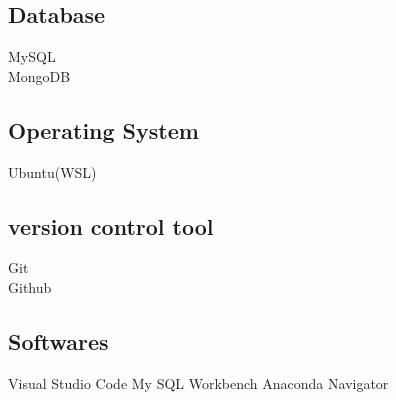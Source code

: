 \documentclass[]{deedy-resume-openfont}
\begin{document}
\begin{minipage}[t]{0.33\textwidth}
\subsection{Database}

\textbullet{} MySQL \\
\textbullet{} MongoDB \\

\subsection{Operating System}

\textbullet{} Ubuntu(WSL) \\

\subsection{version control tool}

\textbullet{} Git \\
\textbullet{} Github \\

\subsection{Softwares}

\textbullet{} Visual Studio Code
\textbullet{} My SQL Workbench
\textbullet{} Anaconda Navigator

\sectionsep

\end{minipage}
\hfill
\end{document}
